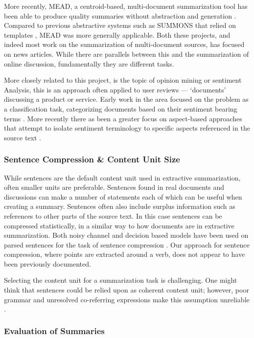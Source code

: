         More recently, MEAD, a centroid-based, multi-document summarization tool has been able to produce quality summaries without abstraction and generation \cite{radev2000centroid}. Compared to previous abstractive systems such as SUMMONS that relied on templates \cite{mckeown1995generating}, MEAD was more generally applicable. Both these projects, and indeed most work on the summarization of multi-document sources, has focused on news articles. While there are parallels between this and the summarization of online discussion, fundamentally they are different tasks.

        More closely related to this project, is the topic of opinion mining or sentiment Analysis, this is an approach often applied to user reviews --- `documents' discussing a product or service. Early work in the area focused on the problem as a classification task, categorizing documents based on their sentiment bearing terms \cite{turney2002thumbs}. More recently there as been a greater focus on aspect-based approaches that attempt to isolate sentiment terminology to specific aspects referenced in the source text \cite{hu2004mining}.

      \tocless\subsubsection{Sentence Compression \& Content Unit Size}

        While sentences are the default content unit used in extractive summarization, often smaller units are preferable. Sentences found in real documents and discussions can make a number of statements each of which can be useful when creating a summary. Sentences often also include surplus information such as references to other parts of the source text. In this case sentences can be compressed statistically, in a similar way to how documents are in extractive summarization. Both noisy channel and decision based models have been used on parsed sentences for the task of sentence compression \cite{knight2000statistics}. Our approach for sentence compression, where points are extracted around a verb, does not appear to have been previously documented.

        Selecting the content unit for a summarization task is challenging. One might think that sentences could be relied upon as coherent content unit; however, poor grammar and unresolved co-referring expressions make this assumption unreliable \cite{witbrock1999ultra}.

      \tocless\subsubsection{Evaluation of Summaries}


